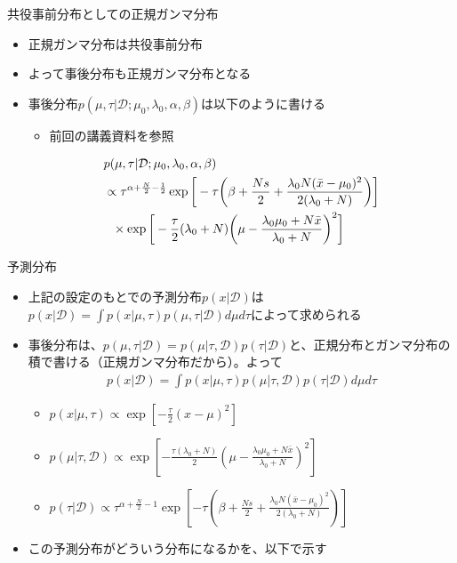 \documentclass[aspectratio=169,unicode,dvipdfmx,14pt]{beamer}
\begin{document}
\begin{frame}{共役事前分布としての正規ガンマ分布}
\begin{itemize}
\item 正規ガンマ分布は共役事前分布
\item よって事後分布も正規ガンマ分布となる
\item 事後分布$p(\mu,\tau|\mathcal{D}; \mu_0, \lambda_0, \alpha, \beta)$は以下のように書ける
\begin{itemize}
\item 前回の講義資料を参照
\end{itemize}
\begin{align}
& p(\mu,\tau|\mathcal{D}; \mu_0, \lambda_0, \alpha, \beta) 
\notag \\ & \propto
\tau^{\alpha + \frac{N}{2} - \frac{1}{2}}
\exp \bigg[ - \tau \bigg( \beta + \frac{Ns}{2} + \frac{ \lambda_0 N (\bar{x} - \mu_0)^2 }{ 2( \lambda_0 + N ) }
\bigg) \bigg]
\notag \\ & \mbox{ \ }
\times \exp \bigg[ - \frac{\tau}{2} ( \lambda_0 + N ) \bigg( \mu - \frac{ \lambda_0 \mu_0 + N\bar{x} }{ \lambda_0 + N } \bigg)^2 \bigg]
\end{align}
\end{itemize}
\end{frame}

\begin{frame}{予測分布}
\begin{itemize}
\item 上記の設定のもとでの予測分布$p(x | \mathcal{D})$は
$p(x|\mathcal{D}) = \int p(x|\mu,\tau)p(\mu,\tau|\mathcal{D}) d\mu d\tau$によって求められる
\item 事後分布は、$p(\mu,\tau|\mathcal{D})=p(\mu|\tau,\mathcal{D})p(\tau|\mathcal{D})$と、正規分布とガンマ分布の積で書ける（正規ガンマ分布だから）。よって
\begin{align}
p(x|\mathcal{D}) = \int p(x|\mu,\tau)p(\mu|\tau,\mathcal{D})p(\tau|\mathcal{D}) d\mu d\tau
\end{align}
\vspace{-.2in}
\begin{itemize}
\item $p(x|\mu,\tau) \propto \exp[ - \frac{\tau}{2} (x - \mu)^2 ]$
\item $p(\mu|\tau,\mathcal{D}) \propto \exp [ - \frac{\tau( \lambda_0 + N )}{2}  ( \mu - \frac{ \lambda_0 \mu_0 + N\bar{x} }{ \lambda_0 + N } )^2 ]$
\item $p(\tau|\mathcal{D}) \propto \tau^{\alpha + \frac{N}{2} - 1}
\exp [ - \tau ( \beta + \frac{Ns}{2} + \frac{ \lambda_0 N (\bar{x} - \mu_0)^2 }{ 2( \lambda_0 + N ) } ) ]$
\end{itemize}
\item この予測分布がどういう分布になるかを、以下で示す
\end{itemize}
\end{frame}
\end{document}

